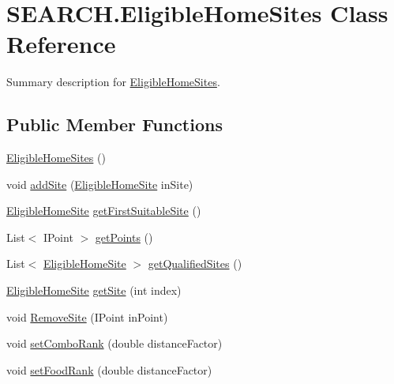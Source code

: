 \hypertarget{class_s_e_a_r_c_h_1_1_eligible_home_sites}{\section{S\-E\-A\-R\-C\-H.\-Eligible\-Home\-Sites Class Reference}
\label{class_s_e_a_r_c_h_1_1_eligible_home_sites}
}


Summary description for \hyperlink{class_s_e_a_r_c_h_1_1_eligible_home_sites}{Eligible\-Home\-Sites}.  


\subsection*{Public Member Functions}
\begin{DoxyCompactItemize}
\item 
\hyperlink{class_s_e_a_r_c_h_1_1_eligible_home_sites_adbe8759b791c2e1003c786eede9bc644}{Eligible\-Home\-Sites} ()
\item 
void \hyperlink{class_s_e_a_r_c_h_1_1_eligible_home_sites_a1f11e669975303d7d2d5eaa70f7eaeb5}{add\-Site} (\hyperlink{class_s_e_a_r_c_h_1_1_eligible_home_site}{Eligible\-Home\-Site} in\-Site)
\item 
\hyperlink{class_s_e_a_r_c_h_1_1_eligible_home_site}{Eligible\-Home\-Site} \hyperlink{class_s_e_a_r_c_h_1_1_eligible_home_sites_a8992ff7ed00648e1b5198c93740e863d}{get\-First\-Suitable\-Site} ()
\item 
List$<$ I\-Point $>$ \hyperlink{class_s_e_a_r_c_h_1_1_eligible_home_sites_a355adc97933b85c303ad5529c0858c45}{get\-Points} ()
\item 
List$<$ \hyperlink{class_s_e_a_r_c_h_1_1_eligible_home_site}{Eligible\-Home\-Site} $>$ \hyperlink{class_s_e_a_r_c_h_1_1_eligible_home_sites_a6312de00ba952bf68fa09bc2f6b7c977}{get\-Qualified\-Sites} ()
\item 
\hyperlink{class_s_e_a_r_c_h_1_1_eligible_home_site}{Eligible\-Home\-Site} \hyperlink{class_s_e_a_r_c_h_1_1_eligible_home_sites_a4e202ce1ba8f052e884aed2b2122b332}{get\-Site} (int index)
\item 
void \hyperlink{class_s_e_a_r_c_h_1_1_eligible_home_sites_adae2d4a814ad7417e4a67068dbf0e69a}{Remove\-Site} (I\-Point in\-Point)
\item 
void \hyperlink{class_s_e_a_r_c_h_1_1_eligible_home_sites_a205ba5d8fbc8653b23344bd5a4d7a968}{set\-Combo\-Rank} (double distance\-Factor)
\item 
void \hyperlink{class_s_e_a_r_c_h_1_1_eligible_home_sites_a071e1c850cec41ec37a0a18c3ca949b4}{set\-Food\-Rank} (double distance\-Factor)

\end{DoxyCompactItemize}
